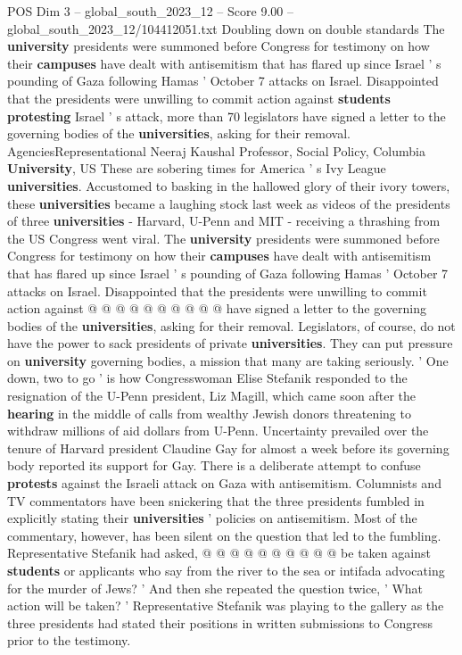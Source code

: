\begin{textsample}{POS Dim 3 – global\_south\_2023\_12 – Score 9.00 – global\_south\_2023\_12/104412051.txt}  \label{ex:f3_pos_440}
Doubling down on double standards The \textbf{university} presidents were summoned before Congress for testimony on how their \textbf{campuses} have dealt with antisemitism that has flared up since Israel ' s pounding of Gaza following Hamas ' October 7 attacks on Israel.
Disappointed that the presidents were unwilling to commit action against \textbf{students} \textbf{protesting} Israel ' s attack, more than 70 legislators have signed a letter to the governing bodies of the \textbf{universities}, asking for their removal.
AgenciesRepresentational Neeraj Kaushal Professor, Social Policy, Columbia \textbf{University}, US These are sobering times for America ' s Ivy League \textbf{universities}.
Accustomed to basking in the hallowed glory of their ivory towers, these \textbf{universities} became a laughing stock last week as videos of the presidents of three \textbf{universities} - Harvard, U-Penn and MIT - receiving a thrashing from the US Congress went viral.
The \textbf{university} presidents were summoned before Congress for testimony on how their \textbf{campuses} have dealt with antisemitism that has flared up since Israel ' s pounding of Gaza following Hamas ' October 7 attacks on Israel.
Disappointed that the presidents were unwilling to commit action against @ @ @ @ @ @ @ @ @ @ have signed a letter to the governing bodies of the \textbf{universities}, asking for their removal.
Legislators, of course, do not have the power to sack presidents of private \textbf{universities}.
They can put pressure on \textbf{university} governing bodies, a mission that many are taking seriously. ' One down, two to go ' is how Congresswoman Elise Stefanik responded to the resignation of the U-Penn president, Liz Magill, which came soon after the \textbf{hearing} in the middle of calls from wealthy Jewish donors threatening to withdraw millions of aid dollars from U-Penn.
Uncertainty prevailed over the tenure of Harvard president Claudine Gay for almost a week before its governing body reported its support for Gay.
There is a deliberate attempt to confuse \textbf{protests} against the Israeli attack on Gaza with antisemitism.
Columnists and TV commentators have been snickering that the three presidents fumbled in explicitly stating their \textbf{universities} ' policies on antisemitism.
Most of the commentary, however, has been silent on the question that led to the fumbling.
Representative Stefanik had asked, @ @ @ @ @ @ @ @ @ @ be taken against \textbf{students} or applicants who say from the river to the sea or intifada advocating for the murder of Jews? ' And then she repeated the question twice, ' What action will be taken? ' Representative Stefanik was playing to the gallery as the three presidents had stated their positions in written submissions to Congress prior to the testimony.

\end{textsample}
